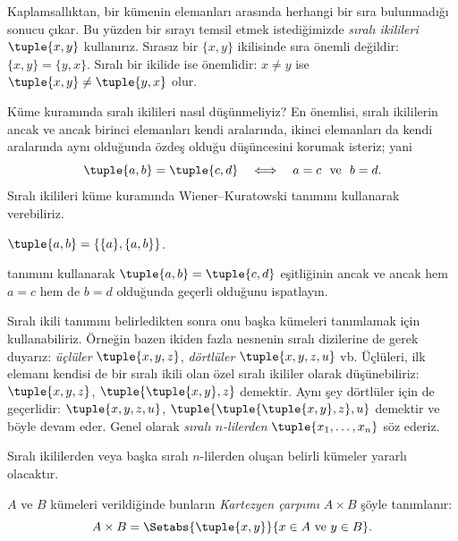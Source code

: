 \documentclass[../../../include/open-logic-section]{subfiles}
\begin{document}

\begin{explain}
Kaplamsallıktan, bir kümenin elemanları arasında herhangi bir sıra bulunmadığı
sonucu çıkar. Bu yüzden bir sırayı temsil etmek istediğimizde \emph{sıralı
ikilileri} $\tuple{x, y}$ kullanırız. Sırasız bir $\{x, y\}$ ikilisinde sıra
önemli değildir: $\{x, y\} = \{y, x\}$. Sıralı bir ikilide ise önemlidir:
$x \neq y$ ise $\tuple{x, y} \neq \tuple{y, x}$ olur.

Küme kuramında sıralı ikilileri nasıl düşünmeliyiz? En önemlisi, sıralı
ikililerin ancak ve ancak birinci elemanları kendi aralarında, ikinci
elemanları da kendi aralarında aynı olduğunda özdeş olduğu düşüncesini korumak
isteriz; yani
\[
  \tuple{a, b}= \tuple{c, d}\quad\Longleftrightarrow\quad
  a = c\ \text{ ve }\ b=d.
\]
Sıralı ikilileri küme kuramında Wiener--Kuratowski tanımını kullanarak
verebiliriz.
\end{explain}

\begin{defn}
	$\tuple{a, b} = \{\{a\}, \{a, b\}\}$.
\end{defn}

\begin{prob}
	 tanımını kullanarak
	$\tuple{a, b}= \tuple{c, d}$ eşitliğinin ancak ve ancak hem $a = c$ hem de
	$b=d$ olduğunda geçerli olduğunu ispatlayın.
\end{prob}

\begin{explain}
Sıralı ikili tanımını belirledikten sonra onu başka kümeleri tanımlamak için
kullanabiliriz. Örneğin bazen ikiden fazla nesnenin sıralı dizilerine de gerek
duyarız: \emph{üçlüler} $\tuple{x, y, z}$, \emph{dörtlüler}
$\tuple{x, y, z, u}$ vb. Üçlüleri, ilk elemanı kendisi de bir sıralı ikili
olan özel sıralı ikililer olarak düşünebiliriz: $\tuple{x, y, z}$,
$\tuple{\tuple{x, y},z}$ demektir. Aynı şey dörtlüler için de geçerlidir:
$\tuple{x,y,z,u}$, $\tuple{\tuple{\tuple{x,y},z},u}$ demektir ve böyle devam
eder. Genel olarak \emph{sıralı $n$-lilerden}
$\tuple{x_1, \dots, x_n}$ söz ederiz.

Sıralı ikililerden veya başka sıralı $n$-lilerden oluşan belirli kümeler
yararlı olacaktır.
\end{explain}

\begin{defn}
$A$ ve $B$ kümeleri verildiğinde bunların \emph{Kartezyen çarpımı}
$A \times B$ şöyle tanımlanır:
\[
  A \times B = \Setabs{\tuple{x, y}}{x \in A \text{ ve } y \in B}.
\]
\end{defn}
\end{document}
